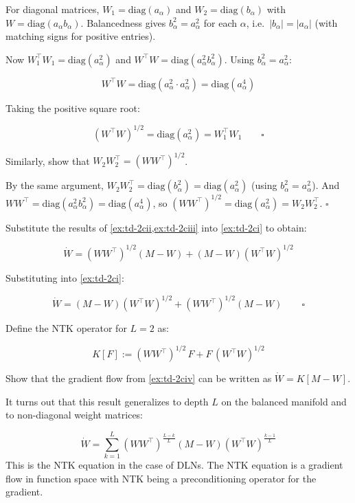 \documentclass[11pt]{article}
\begin{document}
\begin{solution}[ex:td-2cii]
For diagonal matrices, \(W_1 = \text{diag}(a_\alpha)\)
and \(W_2 = \text{diag}(b_\alpha)\) with
\(W = \text{diag}(a_\alpha b_\alpha)\). Balancedness gives
\(b_\alpha^2 = a_\alpha^2\) for each \(\alpha\),
i.e.~\(|b_\alpha| = |a_\alpha|\) (with matching signs for positive
entries).

Now \(W_1^\top W_1 = \text{diag}(a_\alpha^2)\) and
\(W^\top W = \text{diag}(a_\alpha^2 b_\alpha^2)\). Using
\(b_\alpha^2 = a_\alpha^2\):

\[W^\top W = \text{diag}(a_\alpha^2 \cdot a_\alpha^2) = \text{diag}(a_\alpha^4)\]

Taking the positive square root:

\[(W^\top W)^{1/2} = \text{diag}(a_\alpha^2) = W_1^\top W_1 \qquad \square\]
\end{solution}

\begin{exercise}
\label{ex:td-2ciii}
Similarly, show that
\(W_2 W_2^\top = (W W^\top)^{1/2}\).
\end{exercise}

\begin{solution}[ex:td-2ciii]
By the same argument,
\(W_2 W_2^\top = \text{diag}(b_\alpha^2) = \text{diag}(a_\alpha^2)\)
(using \(b_\alpha^2 = a_\alpha^2\)). And
\(WW^\top = \text{diag}(a_\alpha^2 b_\alpha^2) = \text{diag}(a_\alpha^4)\),
so \((WW^\top)^{1/2} = \text{diag}(a_\alpha^2) = W_2 W_2^\top\).
\(\square\)
\end{solution}

\begin{exercise}
\label{ex:td-2civ}
Substitute the results of \cref{ex:td-2cii,ex:td-2ciii} into \cref{ex:td-2ci}
to obtain:

\[\dot{W} = (W W^\top)^{1/2}(M - W) + (M - W)(W^\top W)^{1/2}\]
\end{exercise}

\begin{solution}[ex:td-2civ]
Substituting into \cref{ex:td-2ci}:

\[\dot{W} = (M - W)(W^\top W)^{1/2} + (WW^\top)^{1/2}(M - W) \qquad \square\]
\end{solution}

\begin{exercise}
\label{ex:td-2d}
Define the NTK operator for \(L = 2\) as:

\[K[F] := (WW^\top)^{1/2}\, F + F\, (W^\top W)^{1/2}\]

Show that the gradient flow from \cref{ex:td-2civ} can be written as
\(\dot{W} = K[M - W]\).

It turns out that this result generalizes to depth \(L\) on the balanced
manifold and to non-diagonal weight matrices:

\[\dot{W} = \sum_{k=1}^{L} (WW^\top)^{\frac{L-k}{L}} (M - W) (W^\top W)^{\frac{k-1}{L}}\]
This is the NTK equation in the case of DLNs. The NTK equation is a gradient flow in function space with NTK being a preconditioning operator for the gradient.
\end{exercise}
\end{document}
